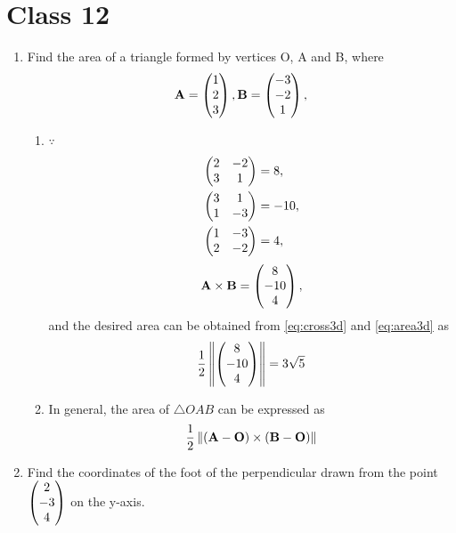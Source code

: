 \documentclass[journal,12pt,twocolumn]{IEEEtran}
\renewcommand\thesection{\arabic{section}}
\begin{document}
\section{Class 12}
\renewcommand{\theequation}{\theenumi}
\begin{enumerate}[label=\thesection.\arabic*.,ref=\thesection.\theenumi]
	\item Find the area of a triangle formed by vertices O, A and B, where 
		\begin{align}
			\mathbf{A} = \begin{pmatrix}1 \\ 2 \\ 3\end{pmatrix},
			\mathbf{B}  = \begin{pmatrix}-3 \\ -2 \\ 1\end{pmatrix},
		\end{align}
\solution 
\begin{enumerate}
	\item 
$\because $
		\begin{align}
			\begin{pmatrix}2 & -2 \\ 3 & 1 \end{pmatrix} &= 8,
\\
			\begin{pmatrix}3 & 1 \\ 1 & -3 \end{pmatrix} &= -10,
			\\
			\begin{pmatrix}1 & -3 \\ 2 & -2 \end{pmatrix} &= 4,
		\end{align}
		\begin{align}
			\mathbf{A}  \times 
			\mathbf{B}  = \begin{pmatrix}8 \\ -10 \\ 4\end{pmatrix},
		\end{align}
		and the  desired area can be obtained from 
  \eqref{eq:cross3d} and 
  \eqref{eq:area3d} as
		\begin{align}
			\frac{1}{2}\left\lVert\begin{pmatrix}8 \\ -10 \\ 4\end{pmatrix}\right\rVert = 3 \sqrt{5}
		\end{align}
	\item In general, the area of $\triangle OAB$ can be expressed as
		\begin{align}
		\frac{1}{2}	\left\lVert\left(\mathbf{A}-\mathbf{O}\right)  \times 
			\left(\mathbf{B}- \mathbf{O}\right)\right\rVert  
		\end{align}
		\end{enumerate}
	\item  Find the coordinates of the foot of the perpendicular drawn from the point $ \begin{pmatrix}2 \\-3 \\4 \end{pmatrix} $ on the y-axis.

\end{enumerate}
\end{document}
